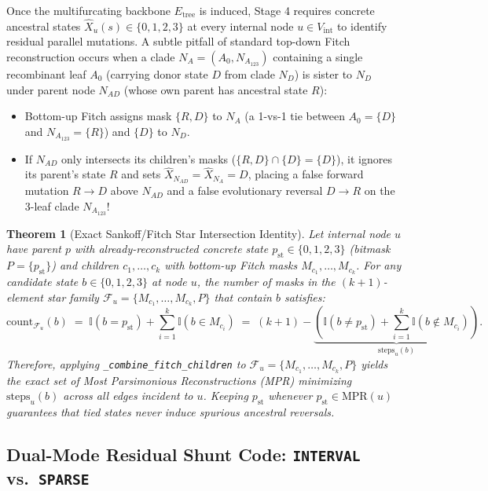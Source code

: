 \documentclass[11pt,a4paper]{article}
\newtheorem{theorem}{Theorem}
\begin{document}
Once the multifurcating backbone $E_{\text{tree}}$ is induced, Stage 4 requires concrete ancestral states $\hat{X}_u(s) \in \{0,1,2,3\}$ at every internal node $u \in V_{\text{int}}$ to identify residual parallel mutations. A subtle pitfall of standard top-down Fitch reconstruction occurs when a clade $N_A = (A_0, N_{A_{123}})$ containing a single recombinant leaf $A_0$ (carrying donor state $D$ from clade $N_D$) is sister to $N_D$ under parent node $N_{AD}$ (whose own parent has ancestral state $R$):
\begin{itemize}[leftmargin=1.8em]
    \item Bottom-up Fitch assigns mask $\{R, D\}$ to $N_A$ (a 1-vs-1 tie between $A_0=\{D\}$ and $N_{A_{123}}=\{R\}$) and $\{D\}$ to $N_D$.
    \item If $N_{AD}$ only intersects its children's masks ($\{R, D\} \cap \{D\} = \{D\}$), it ignores its parent's state $R$ and sets $\hat{X}_{N_{AD}} = \hat{X}_{N_A} = D$, placing a false forward mutation $R \to D$ above $N_{AD}$ and a false evolutionary reversal $D \to R$ on the 3-leaf clade $N_{A_{123}}$!
\end{itemize}

\begin{theorem}[Exact Sankoff/Fitch Star Intersection Identity]
\label{thm:star_mpr}
Let internal node $u$ have parent $p$ with already-reconstructed concrete state $p_{\text{st}} \in \{0,1,2,3\}$ (bitmask $P = \{p_{\text{st}}\}$) and children $c_1, \dots, c_k$ with bottom-up Fitch masks $M_{c_1}, \dots, M_{c_k}$. For any candidate state $b \in \{0,1,2,3\}$ at node $u$, the number of masks in the $(k+1)$-element star family $\mathcal{F}_u = \{M_{c_1}, \dots, M_{c_k}, P\}$ that contain $b$ satisfies:
\begin{equation}
    \text{count}_{\mathcal{F}_u}(b) \;=\; \mathbb{I}(b = p_{\text{st}}) + \sum_{i=1}^{k} \mathbb{I}(b \in M_{c_i}) \;=\; (k + 1) - \underbrace{\left(\mathbb{I}(b \neq p_{\text{st}}) + \sum_{i=1}^{k} \mathbb{I}(b \notin M_{c_i})\right)}_{\text{steps}_u(b)}.
\end{equation}
Therefore, applying \texttt{\_combine\_fitch\_children} to $\mathcal{F}_u = \{M_{c_1}, \dots, M_{c_k}, P\}$ yields the exact set of Most Parsimonious Reconstructions (MPR) minimizing $\text{steps}_u(b)$ across all edges incident to $u$. Keeping $p_{\text{st}}$ whenever $p_{\text{st}} \in \text{MPR}(u)$ guarantees that tied states never induce spurious ancestral reversals.
\end{theorem}

\subsection{Dual-Mode Residual Shunt Code: \texttt{INTERVAL} vs.\ \texttt{SPARSE}}
\end{document}
